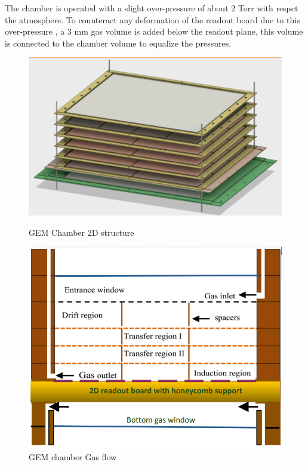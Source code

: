The chamber is operated with a slight over-pressure of about 2 Torr with respct the atmosphere.  To counteract any deformation  of the readout board due to this  over-pressure , a 3 mm gas volume is added below the readout plane, this volume is connected to the chamber volume to equalize  the pressures. 


\begin{figure}[!tbp]
  \centering
  \begin{minipage}[b]{0.45\textwidth}
    \includegraphics[width=\textwidth]{images/chap5/gem_structure_3d.png}
    \caption{GEM Chamber 2D structure}
  \end{minipage}
  \hfill
  \begin{minipage}[b]{0.45\textwidth}
    \includegraphics[width=\textwidth]{images/chap5/gem_structure_chamber_2d.png}
    \caption{GEM chamber Gas flow}
  \end{minipage}
\end{figure}


